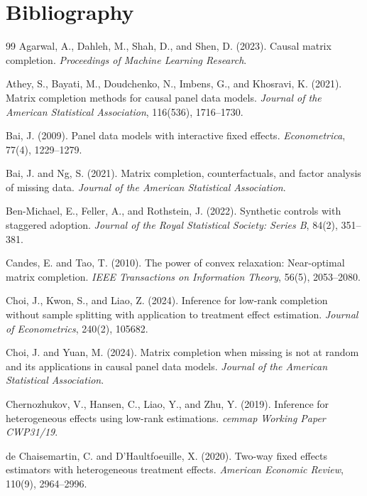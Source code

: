 \documentclass[11pt]{article}
\theoremstyle{definition}
\theoremstyle{plain}
\theoremstyle{remark}
\begin{document}
\section*{Bibliography}
\begin{thebibliography}{99}
Agarwal, A., Dahleh, M., Shah, D., and Shen, D. (2023).
Causal matrix completion.
\emph{Proceedings of Machine Learning Research}.

Athey, S., Bayati, M., Doudchenko, N., Imbens, G., and Khosravi, K. (2021).
Matrix completion methods for causal panel data models.
\emph{Journal of the American Statistical Association}, 116(536), 1716--1730.

Bai, J. (2009).
Panel data models with interactive fixed effects.
\emph{Econometrica}, 77(4), 1229--1279.

Bai, J. and Ng, S. (2021).
Matrix completion, counterfactuals, and factor analysis of missing data.
\emph{Journal of the American Statistical Association}.

Ben-Michael, E., Feller, A., and Rothstein, J. (2022).
Synthetic controls with staggered adoption.
\emph{Journal of the Royal Statistical Society: Series B}, 84(2), 351--381.

Candes, E. and Tao, T. (2010).
The power of convex relaxation: Near-optimal matrix completion.
\emph{IEEE Transactions on Information Theory}, 56(5), 2053--2080.

Choi, J., Kwon, S., and Liao, Z. (2024).
Inference for low-rank completion without sample splitting with application to treatment effect estimation.
\emph{Journal of Econometrics}, 240(2), 105682.

Choi, J. and Yuan, M. (2024).
Matrix completion when missing is not at random and its applications in causal panel data models.
\emph{Journal of the American Statistical Association}.

Chernozhukov, V., Hansen, C., Liao, Y., and Zhu, Y. (2019).
Inference for heterogeneous effects using low-rank estimations.
\emph{cemmap Working Paper CWP31/19}.

de Chaisemartin, C. and D'Haultfoeuille, X. (2020).
Two-way fixed effects estimators with heterogeneous treatment effects.
\emph{American Economic Review}, 110(9), 2964--2996.


\end{thebibliography}
\end{document}

